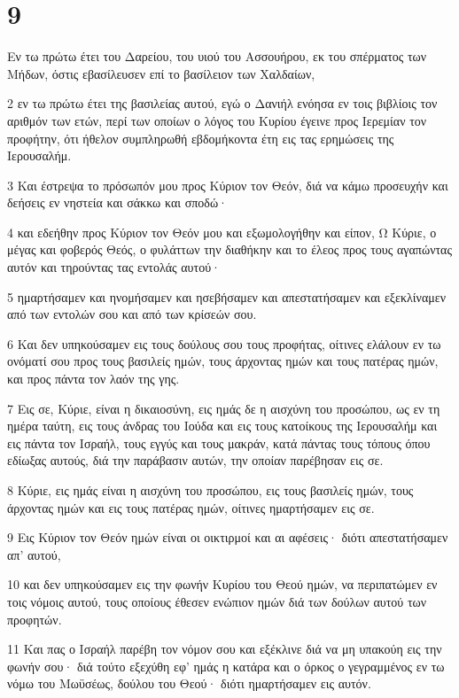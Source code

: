 \chapter{9}

\par Εν τω πρώτω έτει του Δαρείου, του υιού του Ασσουήρου, εκ του σπέρματος των Μήδων, όστις εβασίλευσεν επί το βασίλειον των Χαλδαίων,
\par 2 εν τω πρώτω έτει της βασιλείας αυτού, εγώ ο Δανιήλ ενόησα εν τοις βιβλίοις τον αριθμόν των ετών, περί των οποίων ο λόγος του Κυρίου έγεινε προς Ιερεμίαν τον προφήτην, ότι ήθελον συμπληρωθή εβδομήκοντα έτη εις τας ερημώσεις της Ιερουσαλήμ.
\par 3 Και έστρεψα το πρόσωπόν μου προς Κύριον τον Θεόν, διά να κάμω προσευχήν και δεήσεις εν νηστεία και σάκκω και σποδώ·
\par 4 και εδεήθην προς Κύριον τον Θεόν μου και εξωμολογήθην και είπον, Ω Κύριε, ο μέγας και φοβερός Θεός, ο φυλάττων την διαθήκην και το έλεος προς τους αγαπώντας αυτόν και τηρούντας τας εντολάς αυτού·
\par 5 ημαρτήσαμεν και ηνομήσαμεν και ησεβήσαμεν και απεστατήσαμεν και εξεκλίναμεν από των εντολών σου και από των κρίσεών σου.
\par 6 Και δεν υπηκούσαμεν εις τους δούλους σου τους προφήτας, οίτινες ελάλουν εν τω ονόματί σου προς τους βασιλείς ημών, τους άρχοντας ημών και τους πατέρας ημών, και προς πάντα τον λαόν της γης.
\par 7 Εις σε, Κύριε, είναι η δικαιοσύνη, εις ημάς δε η αισχύνη του προσώπου, ως εν τη ημέρα ταύτη, εις τους άνδρας του Ιούδα και εις τους κατοίκους της Ιερουσαλήμ και εις πάντα τον Ισραήλ, τους εγγύς και τους μακράν, κατά πάντας τους τόπους όπου εδίωξας αυτούς, διά την παράβασιν αυτών, την οποίαν παρέβησαν εις σε.
\par 8 Κύριε, εις ημάς είναι η αισχύνη του προσώπου, εις τους βασιλείς ημών, τους άρχοντας ημών και εις τους πατέρας ημών, οίτινες ημαρτήσαμεν εις σε.
\par 9 Εις Κύριον τον Θεόν ημών είναι οι οικτιρμοί και αι αφέσεις· διότι απεστατήσαμεν απ' αυτού,
\par 10 και δεν υπηκούσαμεν εις την φωνήν Κυρίου του Θεού ημών, να περιπατώμεν εν τοις νόμοις αυτού, τους οποίους έθεσεν ενώπιον ημών διά των δούλων αυτού των προφητών.
\par 11 Και πας ο Ισραήλ παρέβη τον νόμον σου και εξέκλινε διά να μη υπακούη εις την φωνήν σου· διά τούτο εξεχύθη εφ' ημάς η κατάρα και ο όρκος ο γεγραμμένος εν τω νόμω του Μωϋσέως, δούλου του Θεού· διότι ημαρτήσαμεν εις αυτόν.

